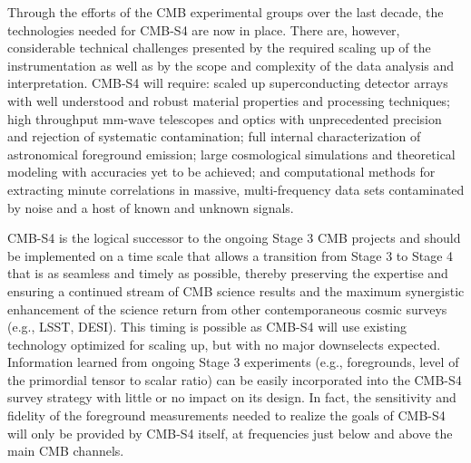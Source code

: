Through the efforts of the CMB experimental groups over the last decade, the technologies needed for CMB-S4 are now in place. There are, however, considerable technical challenges presented by the required scaling up of the instrumentation as well as by the scope and complexity of the data analysis and interpretation.  CMB-S4 will require: scaled up superconducting detector arrays with well understood and robust material properties and processing techniques; high throughput mm-wave telescopes and optics with unprecedented precision and rejection of systematic contamination; full internal characterization of astronomical foreground emission; large cosmological simulations and theoretical modeling with accuracies yet to be achieved; and computational methods for extracting minute correlations in massive, multi-frequency data sets contaminated by noise and a host of known and unknown signals. 


CMB-S4 is the logical successor to the ongoing Stage 3 CMB projects and should be implemented on a time scale that allows a transition from Stage 3 to Stage 4 that is as seamless and timely as possible, thereby preserving the expertise and ensuring a continued  stream of CMB science results and the maximum synergistic enhancement of the science return from other contemporaneous cosmic surveys (e.g., LSST, DESI).  %
This timing is possible as CMB-S4 will use existing technology optimized for scaling up, but with no major downselects expected.  Information learned from ongoing Stage 3 experiments (e.g., foregrounds, level of the primordial tensor to scalar ratio) can be easily incorporated into the CMB-S4 survey strategy with little or no impact on its design. In fact, the sensitivity and fidelity of the foreground measurements needed to realize the goals of CMB-S4 will only be provided by CMB-S4 itself, at frequencies just below and above the main CMB channels.
\eject

 
